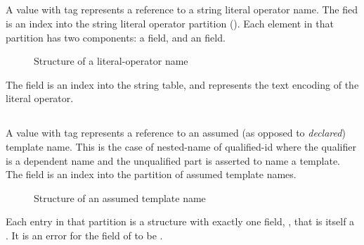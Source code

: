 
\subsection{}
\label{sec:ifc:NameSort:Literal}

A  value with tag  represents a reference to a string literal operator name.
The  fied is an index into the string literal operator partition (). Each element in that
partition has two components: a  field, and an  field. 
%
\begin{figure}[H]
	\centering
	\caption{Structure of a literal-operator name}
	\label{fig:ifc-literal-operator-name-structure}
\end{figure}
The  field is an index into the string table, and represents the text encoding of the literal operator.



\subsection{}
\label{sec:ifc:NameSort:Template}

A  value with tag  represents a reference
to an assumed (as opposed to \emph{declared}) template name.  This is the case of nested-name of qualified-id where
the qualifier is a dependent name and the unqualified part is asserted to name a template.
The  field is an index into the partition of assumed template names.
%
\begin{figure}[H]
	\centering
	\caption{Structure of an assumed template name}
	\label{fig:ifc-assumed-template-name-structure}
\end{figure}
%
Each entry in that partition is a structure with exactly one field, , that is itself a . 
It is an error for the  field of  to be .


